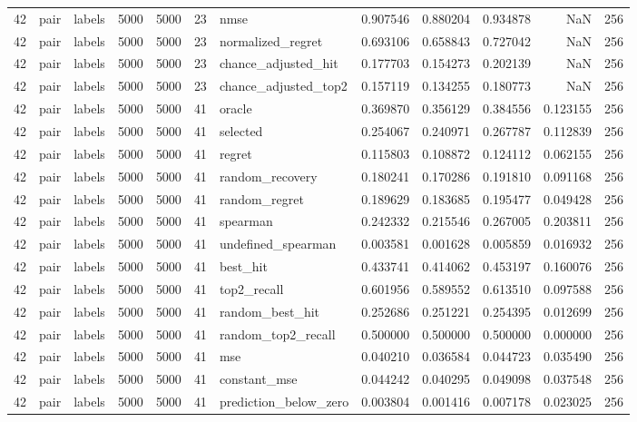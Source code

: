 \begin{tabular}{rllrrrlrrrrr}
42 & pair & labels & 5000 & 5000 & 23 & nmse & 0.907546 & 0.880204 & 0.934878 & NaN & 256 \\
42 & pair & labels & 5000 & 5000 & 23 & normalized_regret & 0.693106 & 0.658843 & 0.727042 & NaN & 256 \\
42 & pair & labels & 5000 & 5000 & 23 & chance_adjusted_hit & 0.177703 & 0.154273 & 0.202139 & NaN & 256 \\
42 & pair & labels & 5000 & 5000 & 23 & chance_adjusted_top2 & 0.157119 & 0.134255 & 0.180773 & NaN & 256 \\
42 & pair & labels & 5000 & 5000 & 41 & oracle & 0.369870 & 0.356129 & 0.384556 & 0.123155 & 256 \\
42 & pair & labels & 5000 & 5000 & 41 & selected & 0.254067 & 0.240971 & 0.267787 & 0.112839 & 256 \\
42 & pair & labels & 5000 & 5000 & 41 & regret & 0.115803 & 0.108872 & 0.124112 & 0.062155 & 256 \\
42 & pair & labels & 5000 & 5000 & 41 & random_recovery & 0.180241 & 0.170286 & 0.191810 & 0.091168 & 256 \\
42 & pair & labels & 5000 & 5000 & 41 & random_regret & 0.189629 & 0.183685 & 0.195477 & 0.049428 & 256 \\
42 & pair & labels & 5000 & 5000 & 41 & spearman & 0.242332 & 0.215546 & 0.267005 & 0.203811 & 256 \\
42 & pair & labels & 5000 & 5000 & 41 & undefined_spearman & 0.003581 & 0.001628 & 0.005859 & 0.016932 & 256 \\
42 & pair & labels & 5000 & 5000 & 41 & best_hit & 0.433741 & 0.414062 & 0.453197 & 0.160076 & 256 \\
42 & pair & labels & 5000 & 5000 & 41 & top2_recall & 0.601956 & 0.589552 & 0.613510 & 0.097588 & 256 \\
42 & pair & labels & 5000 & 5000 & 41 & random_best_hit & 0.252686 & 0.251221 & 0.254395 & 0.012699 & 256 \\
42 & pair & labels & 5000 & 5000 & 41 & random_top2_recall & 0.500000 & 0.500000 & 0.500000 & 0.000000 & 256 \\
42 & pair & labels & 5000 & 5000 & 41 & mse & 0.040210 & 0.036584 & 0.044723 & 0.035490 & 256 \\
42 & pair & labels & 5000 & 5000 & 41 & constant_mse & 0.044242 & 0.040295 & 0.049098 & 0.037548 & 256 \\
42 & pair & labels & 5000 & 5000 & 41 & prediction_below_zero & 0.003804 & 0.001416 & 0.007178 & 0.023025 & 256 \\

\end{tabular}
